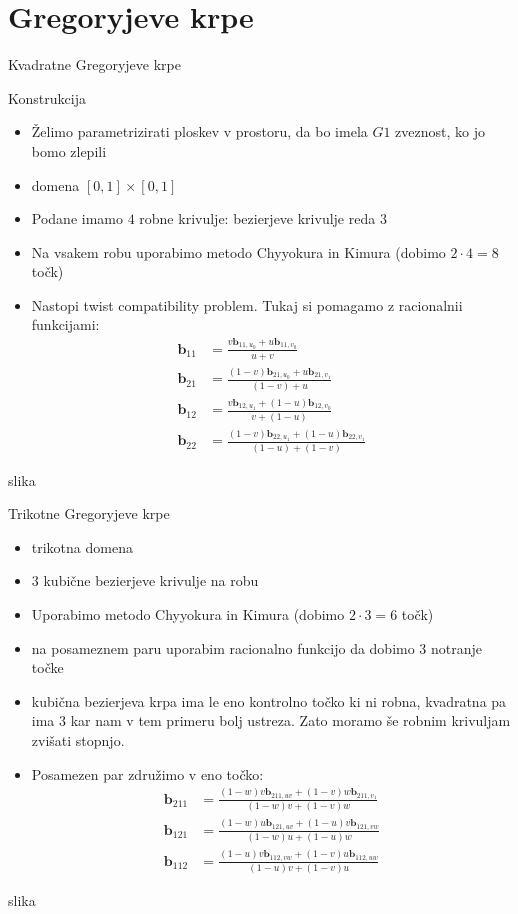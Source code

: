 \documentclass[a4paper,8pt]{beamer}
\newcommand{\tbf}{\textbf}
\begin{document}
\section{Gregoryjeve krpe}
\begin{frame}{Kvadratne Gregoryjeve krpe}


Konstrukcija
\begin{itemize}
	\item Želimo parametrizirati ploskev v prostoru, da bo imela $G1$ zveznost, ko jo bomo zlepili
	\item domena $[0,1] \times [0,1]$
	\item Podane imamo $4$ robne krivulje: bezierjeve krivulje reda $3$
	\item Na vsakem robu uporabimo metodo Chyyokura in Kimura (dobimo $2 \cdot 4 = 8$ točk)
	\item Nastopi twist compatibility problem. Tukaj si pomagamo z racionalnii funkcijami:
		\begin{align*}
		\textbf{b}_{11} &=  \frac{v \textbf{b}_{11,u_0}+u\tbf{b}_{11,v_0}}{u +v} \\
		\tbf{b}_{21} &= \frac{(1-v) \tbf{b}_{21,u_0}+u\tbf{b}_{21,v_1}}{(1-v)+u} \\
		\tbf{b}_{12} &= \frac{v \tbf{b}_{12,u_1}+(1-u)\tbf{b}_{12,v_0}}{v+(1-u)} \\
		\tbf{b}_{22} &= \frac{(1-v) \tbf{b}_{22,u_1}+(1-u)\tbf{b}_{22,v_1}}{(1-u)+(1-v)} 
		\end{align*}
\end{itemize}
	
\end{frame}
\begin{frame}
	slika
\end{frame}

\begin{frame}{Trikotne Gregoryjeve krpe}
	\begin{itemize}
		\item trikotna domena
		\item 3 kubične bezierjeve krivulje na robu
		\item Uporabimo metodo Chyyokura in Kimura (dobimo $2 \cdot 3 = 6$ točk)
		\item na posameznem paru uporabim racionalno funkcijo da dobimo 3 notranje točke
		\item kubična bezierjeva krpa ima le eno kontrolno točko ki ni robna, kvadratna pa ima 3 kar nam v tem primeru bolj ustreza. Zato moramo še robnim krivuljam zvišati stopnjo.
		\item Posamezen par združimo v eno točko:
		\begin{align*}
		\tbf{b}_{211} &= \frac{(1-w)v \tbf{b}_{211,uv}+(1-v)w\tbf{b}_{211,v_1}}{(1-w)v+(1-v)w} \\
		\tbf{b}_{121} &= \frac{(1-w)u \tbf{b}_{121,uv}+(1-u)v\tbf{b}_{121,vw}}{(1-w)u+(1-u)w} \\
		\tbf{b}_{112} &= \frac{(1-u)v \tbf{b}_{112,vw}+(1-v)u\tbf{b}_{112,uw}}{(1-u)v+(1-v)u} 
		\end{align*}
	\end{itemize}
\end{frame}
\begin{frame}
	slika
\end{frame}
\end{document}
